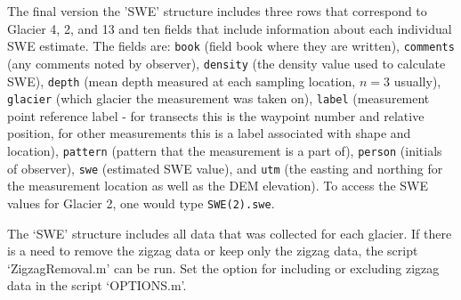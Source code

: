 \documentclass[12pt]{article}
\begin{document}
The final version the 'SWE' structure includes three rows that correspond to Glacier 4, 2, and 13 and ten fields that include information about each individual SWE estimate. The fields are: \texttt{book} (field book where they are written), \texttt{comments} (any comments noted by observer), \texttt{density} (the density value used to calculate SWE), \texttt{depth} (mean depth measured at each sampling location, $n=3$ usually), \texttt{glacier} (which glacier the measurement was taken on), \texttt{label} (measurement point reference label - for transects this is the waypoint number and relative position, for other measurements this is a label associated with shape and location), \texttt{pattern} (pattern that the measurement is a part of), \texttt{person} (initials of observer), \texttt{swe} (estimated SWE value), and \texttt{utm} (the easting and northing for the measurement location as well as the DEM elevation). To access the SWE values for Glacier 2, one would type \texttt{SWE(2).swe}. 

The `SWE' structure includes all data that was collected for each glacier. If there is a need to remove the zigzag data or keep only the zigzag data, the script `ZigzagRemoval.m' can be run. Set the option for including or excluding zigzag data in the script `OPTIONS.m'.









\end{document}
